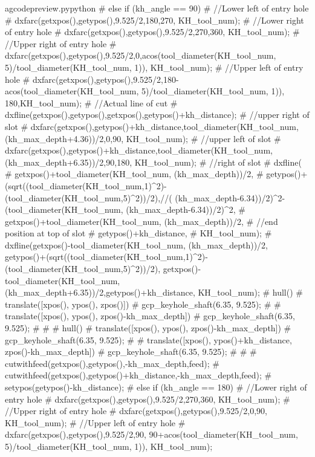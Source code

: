 \documentclass{ltxdoc}
\begin{document}
\begin{writecode}{a}{gcodepreview.py}{python}
{#  } else if (kh_angle == 90) {
#    //Lower left of entry hole
#    dxfarc(getxpos(),getypos(),9.525/2,180,270, KH_tool_num);
#    //Lower right of entry hole
#    dxfarc(getxpos(),getypos(),9.525/2,270,360, KH_tool_num);
#    //Upper right of entry hole
#    dxfarc(getxpos(),getypos(),9.525/2,0,acos(tool_diameter(KH_tool_num, 5)/tool_diameter(KH_tool_num, 1)), KH_tool_num);
#    //Upper left of entry hole
#    dxfarc(getxpos(),getypos(),9.525/2,180-acos(tool_diameter(KH_tool_num, 5)/tool_diameter(KH_tool_num, 1)), 180,KH_tool_num);
#    //Actual line of cut
#    dxfline(getxpos(),getypos(),getxpos(),getypos()+kh_distance);
#    //upper right of slot
#    dxfarc(getxpos(),getypos()+kh_distance,tool_diameter(KH_tool_num, (kh_max_depth+4.36))/2,0,90, KH_tool_num);
#    //upper left of slot
#    dxfarc(getxpos(),getypos()+kh_distance,tool_diameter(KH_tool_num, (kh_max_depth+6.35))/2,90,180, KH_tool_num);
#    //right of slot
#    dxfline(
#        getxpos()+tool_diameter(KH_tool_num, (kh_max_depth))/2, 
#        getypos()+(sqrt((tool_diameter(KH_tool_num,1)^2)-(tool_diameter(KH_tool_num,5)^2))/2),//( (kh_max_depth-6.34))/2)^2-(tool_diameter(KH_tool_num, (kh_max_depth-6.34))/2)^2,
#        getxpos()+tool_diameter(KH_tool_num, (kh_max_depth))/2,
#    //end position at top of slot
#        getypos()+kh_distance, 
#        KH_tool_num);
#    dxfline(getxpos()-tool_diameter(KH_tool_num, (kh_max_depth))/2, getypos()+(sqrt((tool_diameter(KH_tool_num,1)^2)-(tool_diameter(KH_tool_num,5)^2))/2), getxpos()-tool_diameter(KH_tool_num, (kh_max_depth+6.35))/2,getypos()+kh_distance, KH_tool_num);
#    hull(){
#      translate([xpos(), ypos(), zpos()]){
#        gcp_keyhole_shaft(6.35, 9.525);
#      }
#      translate([xpos(), ypos(), zpos()-kh_max_depth]){
#        gcp_keyhole_shaft(6.35, 9.525);
#      }
#    }
#    hull(){
#      translate([xpos(), ypos(), zpos()-kh_max_depth]){
#        gcp_keyhole_shaft(6.35, 9.525);
#      }
#      translate([xpos(), ypos()+kh_distance, zpos()-kh_max_depth]){
#        gcp_keyhole_shaft(6.35, 9.525);
#      }
#    }
#    cutwithfeed(getxpos(),getypos(),-kh_max_depth,feed);
#    cutwithfeed(getxpos(),getypos()+kh_distance,-kh_max_depth,feed);
#    setypos(getypos()-kh_distance);
#  } else if (kh_angle == 180) {
#    //Lower right of entry hole
#    dxfarc(getxpos(),getypos(),9.525/2,270,360, KH_tool_num);
#    //Upper right of entry hole
#    dxfarc(getxpos(),getypos(),9.525/2,0,90, KH_tool_num);
#    //Upper left of entry hole
#    dxfarc(getxpos(),getypos(),9.525/2,90, 90+acos(tool_diameter(KH_tool_num, 5)/tool_diameter(KH_tool_num, 1)), KH_tool_num);
}
\end{writecode}
\end{document}
